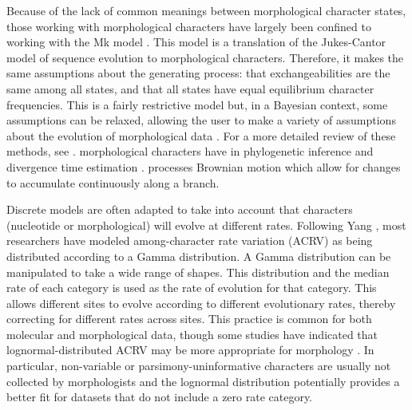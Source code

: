 Because of the lack of common meanings between morphological character states, those working with morphological characters have largely been confined to working with the Mk model \citep{Lewis2001} .
This model is a translation of the Jukes-Cantor model \citep{Jukes1969} of sequence evolution to morphological characters.
Therefore, it makes the same assumptions about the generating process: that exchangeabilities are the same among all  states, and that all states have equal equilibrium character frequencies.
This is a fairly restrictive model but, in a Bayesian context, some assumptions can be relaxed, allowing the user to make a variety of assumptions about the evolution of morphological data \citep{Nylander2004, Wright2016}.
For a more detailed review of these methods, see \citep{Wright2019}.
 morphological characters have  in phylogenetic inference \citep{goloboff2006, parins2017} and divergence time estimation \citep{AlvarezC2019}.
 processes  Brownian motion  which allow for changes to accumulate continuously along a branch.

Discrete models are often adapted to take into account that characters (nucleotide or morphological) will evolve at different rates. Following Yang \citep{Yang1994a},
most researchers have modeled among-character rate variation (ACRV) as being distributed according to a Gamma distribution.
A Gamma distribution can be manipulated to take a wide range of shapes.
This distribution 
and the median rate of each category is used as the rate of evolution for that category.
This allows different sites to evolve according to different evolutionary rates, thereby correcting for different rates across sites.
This practice is common for both molecular and morphological data, though some studies have indicated that lognormal-distributed ACRV may be more appropriate for morphology \citep{wagner2011, Harrison2015}.
In particular, non-variable or parsimony-uninformative characters are usually not collected by morphologists and the lognormal distribution potentially provides a better fit for datasets that do not include a zero rate category.

